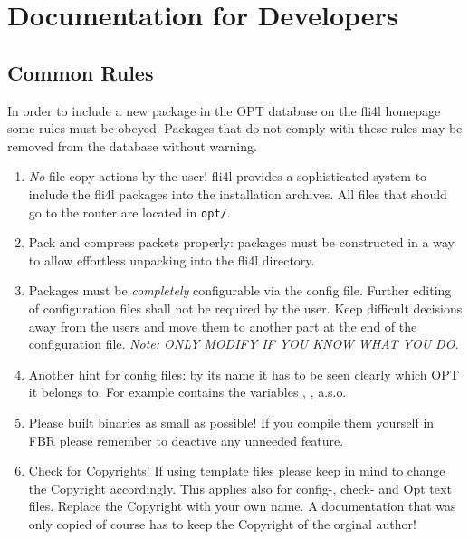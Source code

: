 
\chapter{Documentation for Developers}

\section{Common Rules}

In order to include a new package in the OPT database on the fli4l homepage
some rules must be obeyed. Packages that do not comply with these rules may
be removed from the database without warning.

  \begin{enumerate}
    \item \emph{No} file copy actions by the user! fli4l provides a
     sophisticated system to include the fli4l packages into the installation
     archives. All files that should go to the router are located in \texttt{opt/}.

    \item Pack and compress packets properly: packages must be constructed
    in a way to allow effortless unpacking into the fli4l directory.

    \item Packages must be \emph{completely} configurable via the config file.
    Further editing of configuration files shall not be required by the user.
    Keep difficult decisions away from the users and move them to another part
    at the end of the configuration file. \emph{Note: ONLY MODIFY IF YOU KNOW WHAT
    YOU DO}.

    \item Another hint for config files: by its name it has to be seen clearly
    which OPT it belongs to. For example  contains the variables
    , , a.s.o.

    \item Please built binaries as small as possible! If you compile them yourself
    in FBR please remember to deactive any unneeded feature.

    \item Check for Copyrights! If using template files please keep in mind to
    change the Copyright accordingly. This applies also for config-, check- and
    Opt text files. Replace the Copyright with your own name. A documentation
    that was only copied of course has to keep the Copyright of the orginal author!


\end{enumerate}
